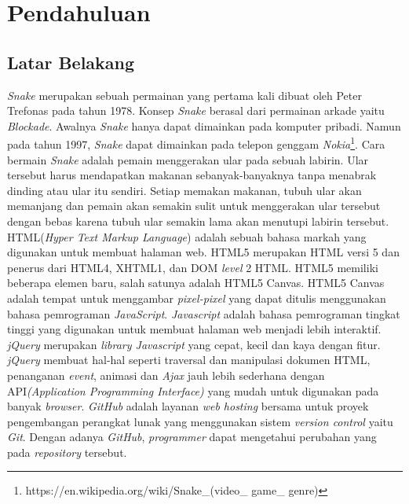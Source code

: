 \chapter{Pendahuluan}
\label{chap:intro}
   
\section{Latar Belakang}
\label{sec:label}

\textit{Snake} merupakan sebuah permainan yang pertama kali dibuat oleh Peter Trefonas pada tahun 1978. Konsep \textit{Snake} berasal dari permainan arkade yaitu \textit{Blockade}. Awalnya \textit{Snake} hanya dapat dimainkan pada komputer pribadi. Namun pada tahun 1997, \textit{Snake} dapat dimainkan pada telepon genggam \textit{Nokia}\footnote{https://en.wikipedia.org/wiki/Snake\_(video\_ game\_ genre)}. Cara bermain \textit{Snake} adalah pemain menggerakan ular pada sebuah labirin. Ular tersebut harus mendapatkan makanan sebanyak-banyaknya tanpa menabrak dinding atau ular itu sendiri. Setiap memakan makanan, tubuh ular akan memanjang dan pemain akan semakin sulit untuk menggerakan ular tersebut dengan bebas karena tubuh ular semakin lama akan menutupi labirin tersebut. \\

HTML(\textit{Hyper Text Markup Language}) adalah sebuah bahasa markah yang digunakan untuk membuat halaman web. HTML5 merupakan HTML versi 5 dan penerus dari HTML4, XHTML1, dan DOM \textit{level} 2 HTML. HTML5 memiliki beberapa elemen baru, salah satunya adalah HTML5 Canvas. HTML5 Canvas adalah tempat untuk menggambar \textit{pixel-pixel} yang dapat ditulis menggunakan bahasa pemrograman \textit{JavaScript}. \textit{Javascript} adalah bahasa pemrograman tingkat tinggi yang digunakan untuk membuat halaman web menjadi lebih interaktif. \textit{jQuery} merupakan \textit{library Javascript} yang cepat, kecil dan kaya dengan fitur. \textit{jQuery} membuat hal-hal seperti traversal dan manipulasi dokumen HTML, penanganan \textit{event}, animasi dan \textit{Ajax} jauh lebih sederhana dengan API\textit{(Application Programming Interface)} yang mudah untuk digunakan pada banyak \textit{browser}. \textit{GitHub} adalah layanan \textit{web hosting} bersama untuk proyek pengembangan perangkat lunak yang menggunakan sistem \textit{version control} yaitu \textit{Git}. Dengan adanya \textit{GitHub}, \textit{programmer} dapat mengetahui perubahan yang pada \textit{repository} tersebut. \\

